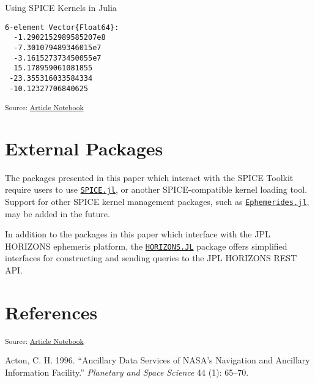 \documentclass[
]{article}
\newlength{\cslhangindent}
\newenvironment{CSLReferences}[2] %
 {\begin{list}{}{%
  \setlength{\itemindent}{0pt}
  \setlength{\leftmargin}{0pt}
  \setlength{\parsep}{0pt}
  \ifodd #1
   \setlength{\leftmargin}{\cslhangindent}
   \setlength{\itemindent}{-1\cslhangindent}
  \fi
  \setlength{\itemsep}{#2\baselineskip}}}
 {\end{list}}
\begin{document}
\begin{codelisting}

\caption{\label{lst-spice-fetching}Using SPICE Kernels in Julia}


\end{codelisting}%

\begin{verbatim}
6-element Vector{Float64}:
  -1.2902152989585207e8
  -7.301079489346015e7
  -3.161527373450055e7
  15.178959061081855
 -23.355316033584334
 -10.12327706840625
\end{verbatim}

\textsubscript{Source:
\href{https://cadojo.github.io/ephemeris.loopy.codes/index.qmd.html}{Article
Notebook}}

\section{External Packages}\label{external-packages}

The packages presented in this paper which interact with the SPICE
Toolkit require users to use
\href{https://github.com/JuliaAstro/SPICe.jl}{\texttt{SPICE.jl}}, or
another SPICE-compatible kernel loading tool. Support for other SPICE
kernel management packages, such as
\href{https://github.com/JuliaSpaceMissionDesign/Ephemerides.jl}{\texttt{Ephemerides.jl}},
may be added in the future.

In addition to the packages in this paper which interface with the JPL
HORIZONS ephemeris platform, the
\href{https://github.com/PerezHz/HORIZONS.jl}{\texttt{HORIZONS.JL}}
package offers simplified interfaces for constructing and sending
queries to the JPL HORIZONS REST API.

\section{References}\label{sec-ref}

\textsubscript{Source:
\href{https://cadojo.github.io/ephemeris.loopy.codes/index.qmd.html}{Article
Notebook}}

\label{refs}
\begin{CSLReferences}{1}{0}
Acton, C. H. 1996. {``{Ancillary Data Services of NASA's Navigation and
Ancillary Information Facility}.''} \emph{Planetary and Space Science}
44 (1): 65--70.

\end{CSLReferences}
\end{document}
